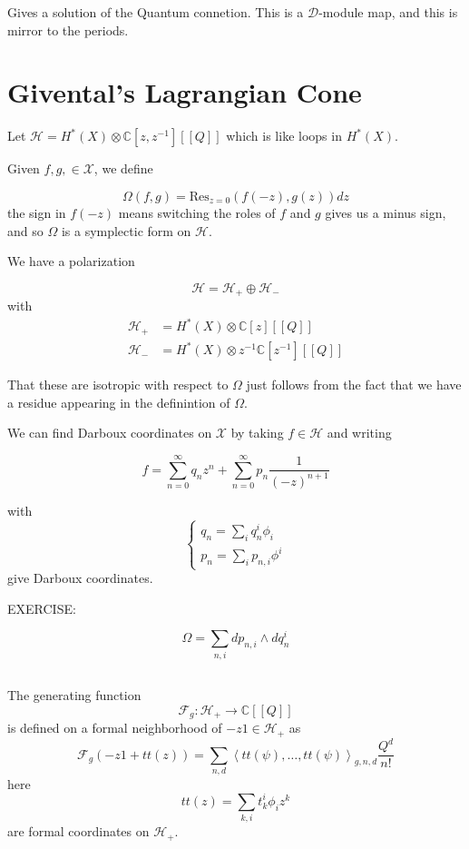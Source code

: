 \documentclass{amsart}
\theoremstyle{definition}
\newcommand{\C}{\mathbb{C}}
\newcommand{\one}{1}
\begin{document}
Gives a solution of the Quantum connetion.
This is a $\mathcal{D}$-module map, and this is mirror to the periods.


\section{Givental's Lagrangian Cone}

Let $\mathcal{H}=H^*(X)\otimes\C[z,z^{-1}][[Q]]$ which is like loops in $H^*(X)$.

Given $f,g,\in\mathcal{X}$, we define

$$\Omega(f,g)=\text{Res}_{z=0}\left( f(-z),g(z)\right)dz$$
the sign in $f(-z)$ means switching the roles of $f$ and $g$ gives us a minus sign, and so $\Omega$ is a symplectic form on $\mathcal{H}$.

We have a polarization

$$\mathcal{H}=\mathcal{H}_+\oplus\mathcal{H}_-$$
with
\begin{align*}
\mathcal{H}_+&=H^*(X)\otimes\C[z][[Q]] \\
\mathcal{H}_-&=H^*(X)\otimes z^{-1}\C[z^{-1}][[Q]]
\end{align*}

That these are isotropic with respect to $\Omega$ just follows from the fact that we have a residue appearing in the definintion of $\Omega$.

We can find Darboux coordinates on $\mathcal{X}$ by taking $f\in\mathcal{H}$ and writing

$$f=\sum_{n=0}^\infty q_n z^n+\sum_{n=0}^\infty p_n\frac{1}{(-z)^{n+1}}$$

with
$$\left\{\begin{array}{l} q_n=\sum_i q_n^i\phi_i \\
p_n=\sum_i p_{n,i}\phi^i 
\end{array}\right.$$
give Darboux coordinates.

EXERCISE:

$$\Omega=\sum_{n,i} dp_{n,i}\wedge dq_n^i$$


\subsection{}

The generating function $$\mathcal{F}_g:\mathcal{H}_+\to\C[[Q]]$$
is defined on a formal neighborhood of $-z\one\in\mathcal{H}_+$ as
$$\mathcal{F}_g(-z\one+tt(z))
=\sum_{n,d}\left\langle tt(\psi),\dots,tt(\psi)\right\rangle_{g,n,d} \frac{Q^d}{n!}$$
here $$tt(z)=\sum_{k,i} t^i_k\phi_iz^k$$
are formal coordinates on $\mathcal{H}_+$.
\end{document}
